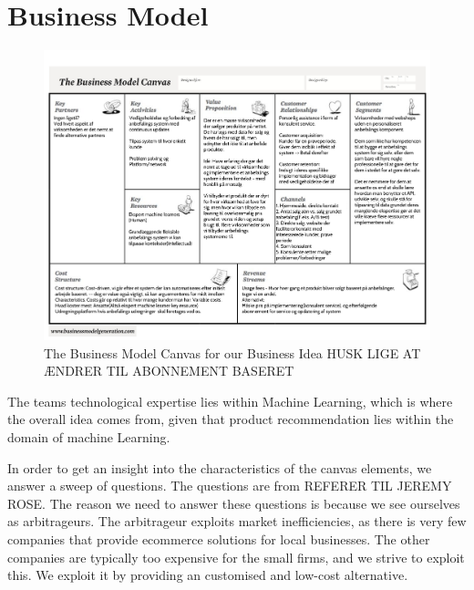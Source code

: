 \section{Business Model}
\begin{figure}
	\centering
	\includegraphics[width = \textwidth]{figures/business-model-canvas}
	\caption{The Business Model Canvas for our Business Idea HUSK LIGE AT ÆNDRER TIL ABONNEMENT BASERET}
	\label{fig:BusinessModelCanvas}
\end{figure}

The teams technological expertise lies within Machine Learning, which is where the overall idea comes from, given that product recommendation lies within the domain of machine Learning.

In order to get an insight into the characteristics of the canvas elements, we answer a sweep of questions. 
The questions are from REFERER TIL JEREMY ROSE.
The reason we need to answer these questions is because we see ourselves as arbitrageurs.
The arbitrageur exploits market inefficiencies, as there is very few companies that provide ecommerce solutions for local businesses. 
The other companies are typically too expensive for the small firms, and we strive to exploit this.
We exploit it by providing an customised and low-cost alternative.

